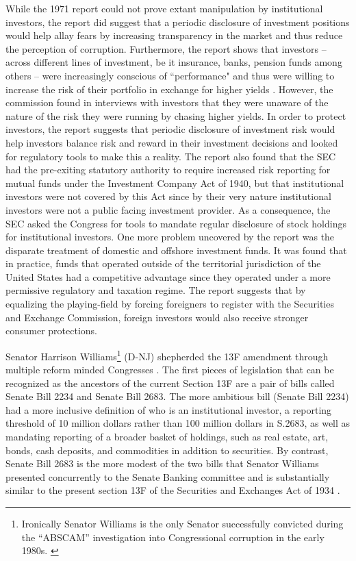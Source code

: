 While the 1971 report could not prove extant manipulation by institutional investors, the report did suggest that a periodic disclosure of investment positions would help allay fears by increasing transparency in the market and thus reduce the perception of corruption. Furthermore, the report shows that investors -- across different lines of investment, be it insurance, banks, pension funds among others -- were increasingly conscious of ``performance" and thus were willing to increase the risk of their portfolio in exchange for higher yields \citep{U.S.SecuritiesandExchangeCommission1971}.  However, the commission found in interviews with investors that they were unaware of the nature of the risk they were running by chasing higher yields. In order to protect investors, the report suggests that periodic disclosure of investment risk would help investors balance risk and reward in their investment decisions and looked for regulatory tools to make this a reality. The report also found that the SEC had the pre-exiting statutory authority to require increased risk reporting for mutual funds under the Investment Company Act of 1940, but that institutional investors were not covered by this Act since by their very nature institutional investors were not a public facing investment provider.  As a consequence, the SEC asked the Congress for tools to mandate regular disclosure of stock holdings for institutional investors.  
One more problem uncovered by the report was the disparate treatment of domestic and offshore investment funds.  It was found that in practice, funds that operated outside of the territorial jurisdiction of the United States had a competitive advantage since they operated under a more permissive regulatory and taxation regime.  The report suggests that by equalizing the playing-field by forcing foreigners to register with the Securities and Exchange Commission, foreign investors would also receive stronger consumer protections.  
	
Senator Harrison Williams\footnote{Ironically Senator Williams is the only Senator successfully convicted during the ``ABSCAM'' investigation into Congressional corruption in the early 1980s. \cite{gershmanabscam1982}}  (D-NJ) shepherded the 13F amendment through multiple reform minded Congresses \citep{Shaw1981}. 	The first pieces of legislation that can be recognized as the ancestors of the current Section 13F are a pair of bills called Senate Bill 2234 and Senate Bill 2683.   The more ambitious bill (Senate Bill 2234) had a more inclusive definition of who is an institutional investor, a reporting threshold of 10 million dollars rather than 100 million dollars in S.2683, as well as mandating reporting of a broader basket of holdings, such as real estate, art, bonds, cash deposits, and commodities in addition to securities. By contrast, Senate Bill 2683 is the more modest of the two bills that Senator Williams presented concurrently to the Senate Banking committee and is substantially similar to the present section 13F of the Securities and Exchanges Act of 1934 \citep{Hearing71}. 
	
